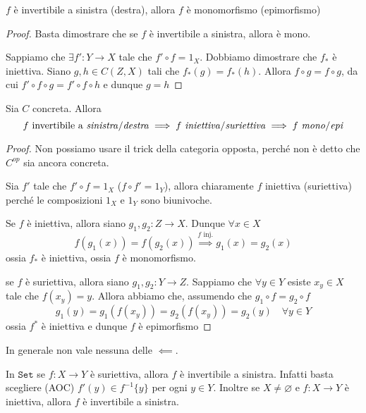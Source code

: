 \begin{proposition}{}
    \(f\) è invertibile a sinistra (destra), allora \(f\) è monomorfismo
    (epimorfismo)
\end{proposition}
\begin{proof}{}
    Basta dimostrare che se \(f\) è invertibile a sinistra, allora è mono.

    Sappiamo che \(\exists f' : Y\to X\) tale che \(f' \circ f = 1_X\). Dobbiamo
    dimostrare che \(f_*\) è iniettiva. Siano \(g, h \in C{(Z, X)}\) tali che \(f_*{(g)} = f_*{(h)}\). Allora \(f \circ g = f \circ g\), da cui \(f' \circ f \circ g = f' \circ f \circ h\) e dunque \(g = h\) 
\end{proof}

\begin{proposition}{}
    Sia \(C\) concreta. Allora
    \[
      f \text{ invertibile a \emph{sinistra}/\emph{destra}} \implies f \text{ \emph{iniettiva}/\emph{suriettiva}} \implies f \text{ \emph{mono}/\emph{epi}}
    \]
\end{proposition}
\begin{proof}{}
    Non possiamo usare il trick della categoria opposta, perché non è detto che
    \(C^{op}\) sia ancora concreta.

    Sia \(f'\) tale che \(f' \circ f = 1_X\) (\(f \circ f' = 1_Y\)), allora
    chiaramente \(f\) iniettiva (suriettiva) perché le composizioni \(1_X\) e \(1_Y\) sono biunivoche.

    Se \(f\) è iniettiva, allora siano \(g_{1}, g_{2}: Z \to X\). Dunque \(\forall x \in X\) 
    \[
      f{(g_{1}{(x)})} = f{(g_{2}{(x)})} \overset{f \text{ inj.}}{\implies } g_{1}{(x)} = g_{2}{(x)}
    \]
    ossia \(f_*\) è iniettiva, ossia \(f\) è monomorfismo.

    se \(f\) è suriettiva, allora siano \(
    g_{1}, g_{2} : Y \to Z\). Sappiamo che \(\forall y \in Y\) esiste \(x_y \in X\) tale che \(f{(x_y)} = y\). Allora abbiamo che, assumendo che \(g_{1}\circ f = g_{2}\circ f\) 
    \[
        g_{1}{(y)} = g_{1}{(f{(x_y)})} = g_{2}{(f{(x_y)})} = g_{2}{(y)} \quad \forall y \in Y
    \]
    ossia \(f^{*}\) è iniettiva e dunque \(f\) è epimorfismo
\end{proof}

In generale non vale nessuna delle \(\impliedby\).
\begin{example}{}
    In \(\mathtt{Set}\) se \(f : X \to Y\) è suriettiva, allora \(f\) è invertibile a
    sinistra. Infatti basta scegliere (AOC) \(f'{(y)} \in f^{-1}\{y\} \) per
    ogni \(y \in Y\). Inoltre se \(X \neq \varnothing\) e \(f : X \to Y\) è
    iniettiva, allora \(f\) è invertibile a sinistra.
\end{example}

